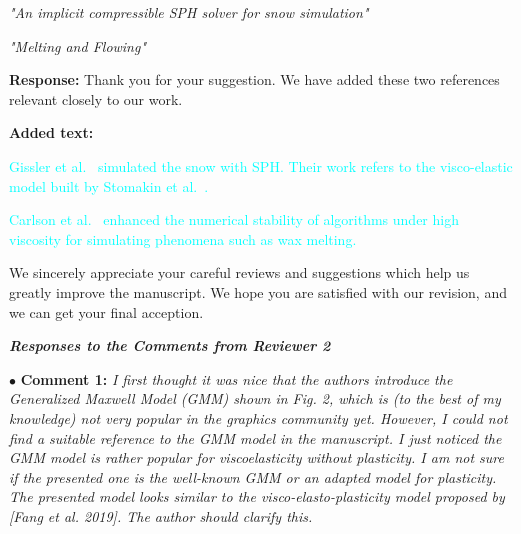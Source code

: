 \documentclass[12pt,a4paper]{article}
\newcommand{\revised}[1]{\textcolor{cyan}{#1}}
\begin{document}
\textit{"An implicit compressible SPH solver for snow simulation"
}

\textit{"Melting and Flowing"}


\vspace{0.2cm}
\textbf{Response:}
Thank you for your suggestion. We have added these two references relevant closely to our work.

\vspace{0.2cm}
\textbf{Added text:}

\revised{Gissler et al.~\cite{Gissler2020-snow} simulated the snow with SPH. Their work refers to the visco-elastic model built by Stomakin et al.~\cite{Stomakhin2014}.}

\revised{Carlson et al.~\cite{Carlson2002} enhanced the numerical stability of algorithms under high viscosity for simulating phenomena such as wax melting.}



We sincerely appreciate your careful reviews and suggestions which help us greatly improve the manuscript. We hope you are satisfied with our revision, and we can get your final acception.



\newpage
\vspace{-1.5cm}
\begin{flushleft}
	\textit{\textbf{Responses to the Comments from Reviewer 2}}
\end{flushleft}



\vspace{0.4cm}
\noindent$\bullet$ \enspace \textbf{Comment 1:}
\textit{I first thought it was nice that the authors introduce the Generalized Maxwell Model (GMM) shown in Fig. 2, which is (to the best of my knowledge) not very popular in the graphics community yet. However, I could not find a suitable reference to the GMM model in the manuscript. I just noticed the GMM model is rather popular for viscoelasticity without plasticity. I am not sure if the presented one is the well-known GMM or an adapted model for plasticity. The presented model looks similar to the visco-elasto-plasticity model proposed by [Fang et al. 2019]. The author should clarify this.}
\end{document}
